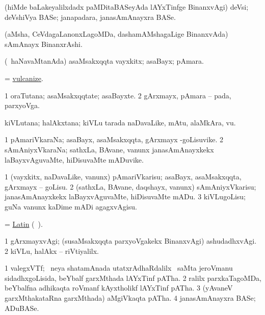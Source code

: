 \noindent 
\gl{\pagu}
\expl{}
\bmng
  (hiMde baLakeyalilxdadx paMDitaBASeyAda lAYxTinfge BinanxvAgi) deVsi; deVshiVya BASe; janapadara, janasAmAnayxra BASe. 
\emng
\eentry

\bentry
{}
\gl{\nA}
\expl{}
\bmng
 (aMsha, CeVdagaLanonxLagoMDa, dashamAMshagaLige BinanxvAda) sAmAnayx BinanxrAshi. 
\emng
\eentry

\bentry
{} 
\gl{\nA}
\expl{}
\bmng
 (\kanmu\ haNavaMtanAda) asaMsakxqqta vayxkitx; asaBayx; pAmara. 
\emng
\eentry

\bentry
{} 
\gl{\sakirx}
\expl{}
\bmng
 = \hyperlink{vulcanize}{vulcanize}. 
\emng
\eentry

\bentry
{} 
\gl{\nA}
\expl{}
\bmng
\bnum
\num{1} oraTutana; asaMsakxqqtate; asaBayxte. 
\num{2} gArxmayx, pAmara -- pada, parxyoVga. 
\enum
\emng
\eentry

\bentry 
{} 
\gl{\nA}
\bmng
 kiVLutana; halAkxtana; kiVLu tarada naDavaLike, mAtu, alaMkAra, \mo vu. 
\emng
\eentry

\bentry 
{} 
\gl{\nA}
\expl{}
\bmng
\bnum
\num{1} pAmariVkaraNa; asaBayx, asaMsakxqqta, gArxmayx -goLisuvike. 
\num{2} sAmAniyxVkaraNa; sathxLa, BAvane, \mo vanunx janasAmAnayxkekx laBayxvAguvaMte, hiDisuvaMte mADuvike. 
\enum
\emng
\eentry

\bentry 
{} 
\gl{\sakirx}
\expl{}
\bmng
\bnum
\num{1} (vayxkitx, naDavaLike, \mo vanunx) pAmariVkarisu; asaBayx, asaMsakxqqta, gArxmayx -- goLisu. 
\num{2} (sathxLa, BAvane, daqshayx, \mo vanunx) sAmAniyxVkarisu; janasAmAnayxkekx laBayxvAguvaMte, hiDisuvaMte mADu. 
\num{3} kiVLugoLisu; guNa \mo vanunx kaDime mADi agagxvAgisu. 
\enum
\emng
\eentry

\bentry
{}
\gl{\nA}
\expl{}
\bmng
 = \hyperref{kandict_l.pdf}{L}{Latin pagu(9)}{Latin} (\pagu\ ). 
\emng
\eentry

\bentry
{} 
\gl{\kirxvi}
\expl{}
\bmng
\bnum
\num{1} gArxmayxvAgi; (susaMsakxqqta parxyoVgakekx BinanxvAgi) ashudadhxvAgi. 
\num{2} kiVLu, halAkx -- riVtiyalilx. 
\enum
\emng
\eentry

\bentry 
{} 
\gl{\nA}
\expl{}
\bmng
\bnum
\num{1} valegxVTf; \kirxsha\ neya shatamAnada utatxrAdhaRdalilx \kanmu\ saMta jeroVmanu sidadhxgoLisida, beYbalf garxMthada lAYxTinf pATha. 
\num{2} ralilx parxkaTagoMDa, beYbalfna adhikaqta roVmanf kAyxtholikf lAYxTinf pATha. 
\num{3}  (yAvaneV garxMthakataRna garxMthada) aMgiVkaqta pATha. 
\num{4}  janasAmAnayxra BASe; ADuBASe. 
\enum
\emng
\eentry

